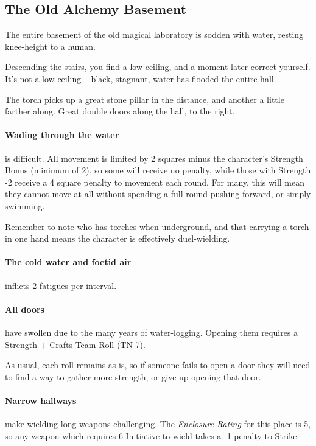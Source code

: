\begin{multicols}{2}
\subsection{The Old Alchemy Basement}
\label{old_alchemy_basement}

The entire basement of the old magical laboratory is sodden with water, resting knee-height to a human.

\begin{boxtext}
  Descending the stairs, you find a low ceiling, and a moment later correct yourself.  It's not a low ceiling -- black, stagnant, water has flooded the entire hall.

  The torch picks up a great stone pillar in the distance, and another a little farther along.
  Great double doors along the hall, to the right.

\end{boxtext}

\paragraph{Wading through the water}
is difficult.
All movement is limited by 2 squares minus the character's Strength Bonus (minimum of 2), so some will receive no penalty, while those with Strength -2 receive a 4 square penalty to movement each round.
For many, this will mean they cannot move at all without spending a full round pushing forward, or simply swimming.

Remember to note who has torches when underground, and that carrying a torch in one hand means the character is effectively duel-wielding.

\paragraph{The cold water and foetid air}
inflicts 2 \glspl{fatigue} per \gls{interval}.

\paragraph{All doors}
have swollen due to the many years of water-logging.
Opening them requires a Strength + Crafts Team Roll (TN 7).

As usual, each roll remains as-is, so if someone fails to open a door they will need to find a way to gather more strength, or give up opening that door.

\paragraph{Narrow hallways}
make wielding long weapons challenging.
The \textit{Enclosure Rating} for this place is 5, so any weapon which requires 6 Initiative to wield takes a -1 penalty to Strike.


\end{multicols}

